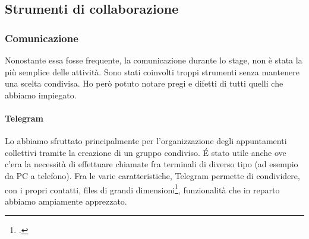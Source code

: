 \subsection{Strumenti di collaborazione}
\subsubsection{Comunicazione}
Nonostante essa fosse frequente, la comunicazione durante lo stage, non è stata la più semplice delle attività. Sono stati coinvolti troppi strumenti senza mantenere una scelta condivisa. Ho però potuto notare pregi e difetti di tutti quelli che abbiamo impiegato.
\paragraph{Telegram} Lo abbiamo sfruttato principalmente per l'organizzazione degli appuntamenti collettivi tramite la creazione di un gruppo condiviso. \'E stato utile anche ove c'era la necessità di effettuare chiamate fra terminali di diverso tipo (ad esempio da PC a telefono).
Fra le varie caratteristiche, Telegram permette di condividere, con i propri contatti, files di grandi dimensioni\footcite{site:telegram}, funzionalità che in reparto abbiamo ampiamente apprezzato.
